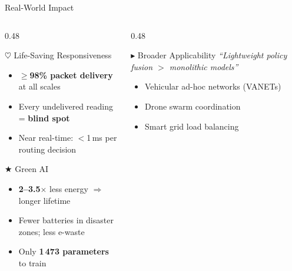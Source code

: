 \documentclass[aspectratio=169, 11pt]{beamer}
\begin{document}
\begin{frame}{Real-World Impact}

\begin{columns}[T]
\begin{column}{0.48\textwidth}

  \begin{block}{\textcolor{polyred}{$\heartsuit$} Life-Saving Responsiveness}
    \begin{itemize}\setlength{\itemsep}{1pt}
      \item $\geq$\textbf{98\% packet delivery} at all scales
      \item Every undelivered reading = \textbf{blind spot}
      \item Near real-time: $<$1\,ms per routing decision
    \end{itemize}
  \end{block}

  \smallskip
  \begin{block}{\textcolor{polygreen}{$\bigstar$} Green AI}
    \begin{itemize}\setlength{\itemsep}{1pt}
      \item \textbf{2--3.5$\times$} less energy $\Rightarrow$ longer lifetime
      \item Fewer batteries in disaster zones; less e-waste
      \item Only \textbf{1\,473 parameters} to train
    \end{itemize}
  \end{block}

\end{column}
\begin{column}{0.48\textwidth}

  \begin{block}{\textcolor{polyblue}{$\blacktriangleright$} Broader Applicability}
    \textit{``Lightweight policy fusion $>$ monolithic models''}
    \begin{itemize}\setlength{\itemsep}{1pt}
      \item Vehicular ad-hoc networks (VANETs)
      \item Drone swarm coordination
      \item Smart grid load balancing
    \end{itemize}
  \end{block}


\end{column}
\end{columns}
\end{frame}
\end{document}
